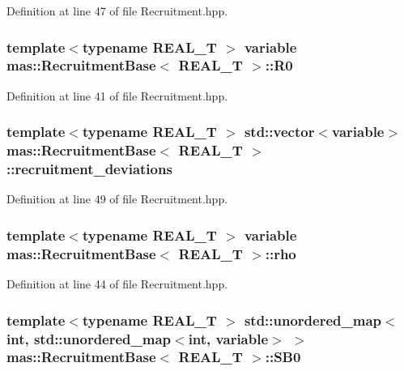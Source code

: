 Definition at line 47 of file Recruitment.\-hpp.

\hypertarget{structmas_1_1_recruitment_base_a4f99fb299e8f00f36645ffb032592e04}{
\subsubsection[{R0}]{\setlength{\rightskip}{0pt plus 5cm}template$<$typename R\-E\-A\-L\-\_\-\-T $>$ {\bf variable} {\bf mas\-::\-Recruitment\-Base}$<$ R\-E\-A\-L\-\_\-\-T $>$\-::R0}}\label{structmas_1_1_recruitment_base_a4f99fb299e8f00f36645ffb032592e04}


Definition at line 41 of file Recruitment.\-hpp.

\hypertarget{structmas_1_1_recruitment_base_acab1229c5bea140584480dee25e28414}{
\subsubsection[{recruitment\-\_\-deviations}]{\setlength{\rightskip}{0pt plus 5cm}template$<$typename R\-E\-A\-L\-\_\-\-T $>$ std\-::vector$<${\bf variable}$>$ {\bf mas\-::\-Recruitment\-Base}$<$ R\-E\-A\-L\-\_\-\-T $>$\-::recruitment\-\_\-deviations}}\label{structmas_1_1_recruitment_base_acab1229c5bea140584480dee25e28414}


Definition at line 49 of file Recruitment.\-hpp.

\hypertarget{structmas_1_1_recruitment_base_a85904d0c8996b9903609f6f9a93d20bc}{
\subsubsection[{rho}]{\setlength{\rightskip}{0pt plus 5cm}template$<$typename R\-E\-A\-L\-\_\-\-T $>$ {\bf variable} {\bf mas\-::\-Recruitment\-Base}$<$ R\-E\-A\-L\-\_\-\-T $>$\-::rho}}\label{structmas_1_1_recruitment_base_a85904d0c8996b9903609f6f9a93d20bc}


Definition at line 44 of file Recruitment.\-hpp.

\hypertarget{structmas_1_1_recruitment_base_ab682c3efec8a1c9ffe3481f193ef6d64}{
\subsubsection[{S\-B0}]{\setlength{\rightskip}{0pt plus 5cm}template$<$typename R\-E\-A\-L\-\_\-\-T $>$ std\-::unordered\-\_\-map$<$int, std\-::unordered\-\_\-map$<$int, {\bf variable}$>$ $>$ {\bf mas\-::\-Recruitment\-Base}$<$ R\-E\-A\-L\-\_\-\-T $>$\-::S\-B0}}\label{structmas_1_1_recruitment_base_ab682c3efec8a1c9ffe3481f193ef6d64}


